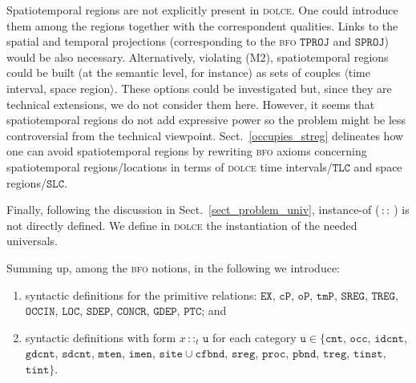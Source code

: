 \documentclass[ao]{iosart2x}
\newcommand{\bfoAxLabel}{\textrm{a$_\texttt{b}$}}
\newcommand{\refbfoax}[1]{({\bfoAxLabel}\ref{#1})}
\newcommand{\pr}[1]{\mathtt{#1}}
\newcommand{\cn}[1]{\mathtt{#1}}
\newcommand{\dolce}{{\textsc{dolce}}}
\newcommand{\bfo}{{\textsc{bfo}}}
\newcommand {\SLCd} {\ensuremath{\pr{SLC}}}
\newcommand {\TLCd} {\ensuremath{\pr{TLC}}}
\newcommand{\cntbcat}{\cn{cnt}}
\newcommand{\idcntbcat}{\cn{idcnt}}
\newcommand{\gdcntbcat}{\cn{gdcnt}}
\newcommand{\sdcntbcat}{\cn{sdcnt}}
\newcommand{\mtenbcat}{\cn{mten}}
\newcommand{\imenbcat}{\cn{imen}}
\newcommand{\sitebcat}{\cn{site}}
\newcommand{\cfbndbcat}{\cn{cfbnd}}
\newcommand{\sregbcat}{\cn{sreg}}
\newcommand{\occbcat}{\cn{occ}}
\newcommand{\procbcat}{\cn{proc}}
\newcommand{\pbndbcat}{\cn{pbnd}}
\newcommand{\tregbcat}{\cn{treg}}
\newcommand{\stregbcat}{\cn{streg}}
\newcommand{\tinstbcat}{\cn{tinst}}
\newcommand{\tintbcat}{\cn{tint}}
\newcommand{\bfocpart}{\pr{cP}}
\newcommand{\bfoopart}{\pr{oP}}
\newcommand{\bfotpart}{\pr{tmP}}
\newcommand{\bfoexist}{\pr{EX}}
\newcommand{\bfoiof}[1]{{\,::_{#1\:\!}}}
\newcommand{\bfosdep}{\pr{SDEP}}
\newcommand{\bfogdep}{\pr{GDEP}}
\newcommand{\bfooccurs}{\pr{OCCIN}}
\newcommand{\bfolocated}{\pr{LOC}}
\newcommand{\bfosregof}{\pr{SREG}}
\newcommand{\bfotregof}{\pr{TREG}}
\newcommand{\bfoparticin}{\pr{PTC}}
\newcommand{\bfoconcr}{\pr{CONCR}}
\newcommand{\bfotproj}{\pr{TPROJ}}
\newcommand{\bfosproj}{\pr{SPROJ}}
\begin{document}
Spatiotemporal regions are not explicitly present in {\dolce}. One could introduce them among the regions together with the correspondent qualities. Links to the spatial and temporal projections (corresponding to the {\bfo} $\bfotproj$ and $\bfosproj$) would be also necessary.
Alternatively, violating (M2), spatiotemporal regions could be built (at the semantic level, for instance) as sets of couples $\langle$time interval, space region$\rangle$. 
%
These options could be investigated but, since they are 
technical extensions, we do not consider them here. However, it seems that spatiotemporal regions do not add expressive power so the problem might be less controversial from the technical viewpoint. %
Sect.~\ref{occupies_streg} delineates how one can avoid spatiotemporal regions by rewriting {\bfo} axioms concerning spatiotemporal regions/locations in terms of {\dolce} time intervals/$\TLCd$ and space regions/$\SLCd$.

Finally, following the discussion in Sect.~\ref{sect_problem_univ}, instance-of ($\bfoiof{}$) is not directly defined. We define in {\dolce} the instantiation of the needed universals.

\smallskip
Summing up, among the {\bfo} notions, in the following we introduce: 
\begin{enumerate}[$(i)$]
\item syntactic definitions for the primitive relations: $\bfoexist$, $\bfocpart$, $\bfoopart$, $\bfotpart$, $\bfosregof$, $\bfotregof$, $\bfooccurs$, $\bfolocated$, $\bfosdep$, $\bfoconcr$, $\bfogdep$, $\bfoparticin$; and 
\item syntactic definitions with form $x \bfoiof{t} \cn{u}$ for each category $\cn{u} \in \{\cntbcat$, $\occbcat$, $\idcntbcat$, $\gdcntbcat$, $\sdcntbcat$, $\mtenbcat$, $\imenbcat$, $\sitebcat{\cup}\cfbndbcat$, $\sregbcat$, $\procbcat$, $\pbndbcat$, $\tregbcat$, $\tinstbcat$, $\tintbcat\}$.
\end{enumerate}

\end{document}
